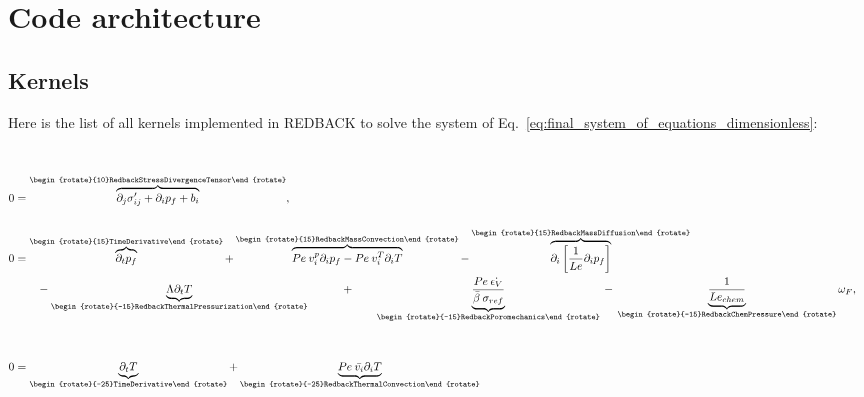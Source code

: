 \documentclass[]{scrreprt}
\newcommand{\redback}{{REDBACK}}
\newcommand{\pd}{\ensuremath{\partial}}
\newcommand{\pdiff}[2]{\ensuremath{\pd_{#2} #1}}
\begin{document}
\chapter{Code architecture}
\label{chapter:code}
\section{Kernels}
Here is the list of all kernels implemented in \redback{} to solve the system of Eq.~\ref{eq:final_system_of_equations_dimensionless}:
\begin{align*}
  \\ \\ 
  0 &= \overbrace{ \pdiff{\sigma^{\prime}_{ij}}{j} + \pdiff{p_f}{i} + b_i }^{\begin{rotate}{10}RedbackStressDivergenceTensor\end{rotate}} , \\ 
  \\   
  0 &= \overbrace{ \pdiff{p_f}{t} }^{\begin{rotate}{15}TimeDerivative\end{rotate}} 
       + \overbrace{ Pe\: v^p_i \pdiff{p_f}{i}
       - Pe\:v^T_i \pdiff{T}{i} }^{\begin{rotate}{15}RedbackMassConvection\end{rotate}} 
       - \overbrace{ \pdiff{\left[\frac{1}{Le} \pdiff{p_f}{i} \right]}{i} }^{\begin{rotate}{15}RedbackMassDiffusion\end{rotate}} 
       \\ \nonumber
  ~ & \qquad 
  - \underbrace{ \Lambda \pdiff{T}{t} }_{\begin{rotate}{-15}RedbackThermalPressurization\end{rotate}} 
  \qquad\quad+ \qquad \underbrace{ \frac{Pe\:\dot{\epsilon_V}}{\bar{\beta}\:\sigma_{ref}}  }_{\begin{rotate}{-15}RedbackPoromechanics\end{rotate}} 
  \: - \: \underbrace{ \frac{1}{Le_{chem}}  }_{\begin{rotate}{-15}RedbackChemPressure\end{rotate}} 
  \omega_F, \\ \\ \\
  0 &= \underbrace{ \pdiff{T}{t}   }_{\begin{rotate}{-25}TimeDerivative\end{rotate}} 
  +  \underbrace{ Pe\:\bar{v_i}\pdiff{T}{i}   }_{\begin{rotate}{-25}RedbackThermalConvection\end{rotate}} 

\end{align*}
\end{document}

